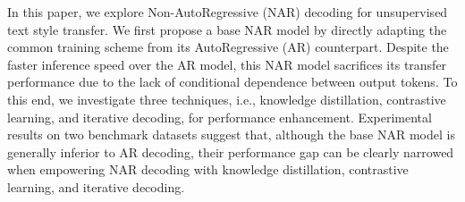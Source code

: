 In this paper, we explore Non-AutoRegressive (NAR) decoding for unsupervised text style transfer. We first propose a base NAR model by directly adapting the common training scheme from its AutoRegressive (AR) counterpart. Despite the faster inference speed over the AR model, this NAR model sacrifices its transfer performance due to the lack of conditional dependence between output tokens. To this end, we investigate three techniques, i.e., knowledge distillation, contrastive learning, and iterative decoding, for performance enhancement. Experimental results on two benchmark datasets suggest that, although the base NAR model is generally inferior to AR decoding, their performance gap can be clearly narrowed when empowering NAR decoding with knowledge distillation, contrastive learning, and iterative decoding.
